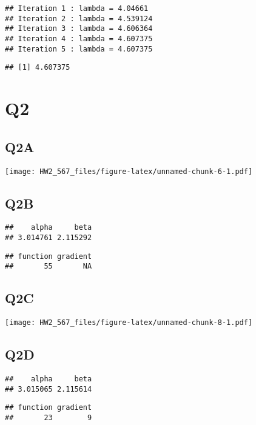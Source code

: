 \documentclass[
]{article}
\begin{document}
\begin{verbatim}
## Iteration 1 : lambda = 4.04661 
## Iteration 2 : lambda = 4.539124 
## Iteration 3 : lambda = 4.606364 
## Iteration 4 : lambda = 4.607375 
## Iteration 5 : lambda = 4.607375
\end{verbatim}

\begin{verbatim}
## [1] 4.607375
\end{verbatim}

\section{Q2}\label{q2}

\subsection{Q2A}\label{q2a}

\texttt{[image: HW2\_567\_files/figure-latex/unnamed-chunk-6-1.pdf]}

\subsection{Q2B}\label{q2b}

\begin{verbatim}
##    alpha     beta 
## 3.014761 2.115292
\end{verbatim}

\begin{verbatim}
## function gradient 
##       55       NA
\end{verbatim}

\subsection{Q2C}\label{q2c}

\texttt{[image: HW2\_567\_files/figure-latex/unnamed-chunk-8-1.pdf]}

\subsection{Q2D}\label{q2d}

\begin{verbatim}
##    alpha     beta 
## 3.015065 2.115614
\end{verbatim}

\begin{verbatim}
## function gradient 
##       23        9
\end{verbatim}
\end{document}
